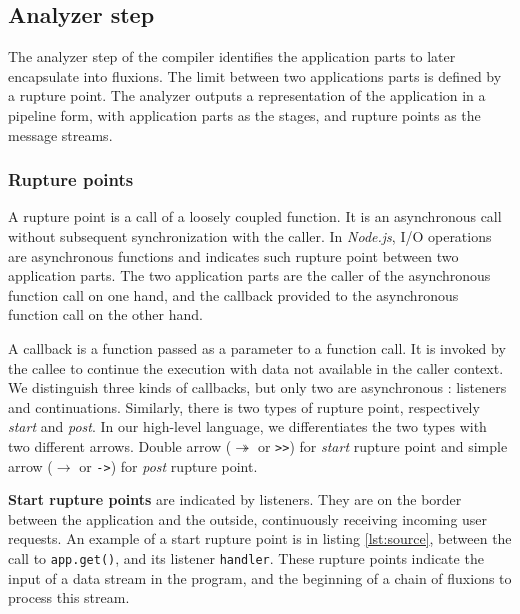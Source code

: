 \subsection{Analyzer step} \label{section:compiler:analyzer}

The analyzer step of the compiler identifies the application parts to later encapsulate into fluxions.
The limit between two applications parts is defined by a rupture point.
The analyzer outputs a representation of the application in a pipeline form, with application parts as the stages, and rupture points as the message streams.

\subsubsection{Rupture points} \label{section:compiler:analyzer:rupture}

A rupture point is a call of a loosely coupled function.
It is an asynchronous call without subsequent synchronization with the caller.
In \textit{Node.js}, I/O operations are asynchronous functions and indicates such rupture point between two application parts.
The two application parts are the caller of the asynchronous function call on one hand, and the callback provided to the asynchronous function call on the other hand.

A callback is a function passed as a parameter to a function call.
It is invoked by the callee to continue the execution with data not available in the caller context.
We distinguish three kinds of callbacks, but only two are asynchronous : listeners and continuations.
Similarly, there is two types of rupture point, respectively \textit{start} and \textit{post}.
In our high-level language, we differentiates the two types with two different arrows.
Double arrow ($\twoheadrightarrow$ or \texttt{>>}) for \textit{start} rupture point and simple arrow ($\to$ or \texttt{->}) for \textit{post} rupture point.

\textbf{Start rupture points} are indicated by listeners. They are on the border between the application and the outside, continuously receiving incoming user requests.
An example of a start rupture point is in listing \ref{lst:source}, between the call to \texttt{app.get()}, and its listener \texttt{handler}.
These rupture points indicate the input of a data stream in the program, and the beginning of a chain of fluxions to process this stream.

